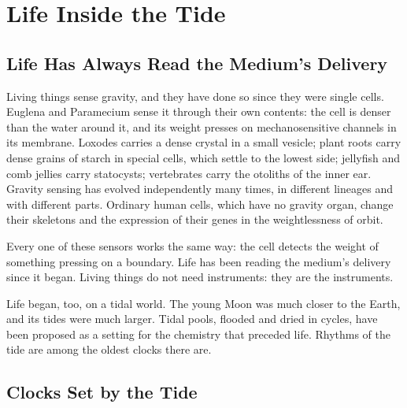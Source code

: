 \documentclass[11pt,a4paper]{article}
\begin{document}
\section{Life Inside the Tide}
\label{sec:life}

\subsection*{Life Has Always Read the Medium's Delivery}

Living things sense gravity, and they have done so since they were single cells. Euglena and Paramecium sense it through their own contents: the cell is denser than the water around it, and its weight presses on mechanosensitive channels in its membrane. Loxodes carries a dense crystal in a small vesicle; plant roots carry dense grains of starch in special cells, which settle to the lowest side; jellyfish and comb jellies carry statocysts; vertebrates carry the otoliths of the inner ear. Gravity sensing has evolved independently many times, in different lineages and with different parts. Ordinary human cells, which have no gravity organ, change their skeletons and the expression of their genes in the weightlessness of orbit.

Every one of these sensors works the same way: the cell detects the weight of something pressing on a boundary.  Life has been reading the medium's delivery since it began. Living things do not need instruments: they are the instruments.

Life began, too, on a tidal world. The young Moon was much closer to the Earth, and its tides were much larger. Tidal pools, flooded and dried in cycles, have been proposed as a setting for the chemistry that preceded life. Rhythms of the tide are among the oldest clocks there are.

\subsection*{Clocks Set by the Tide}
\end{document}
